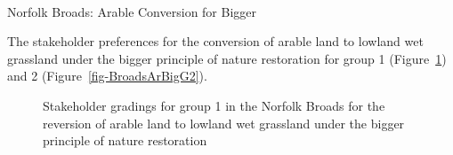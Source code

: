 \documentclass[
  12pt,
  letterpaper,
  DIV=11,
  numbers=noendperiod]{scrartcl}
\makeatletter
\let\oldparagraph\paragraph
\renewcommand{\paragraph}{
    \@ifstar
      \xxxParagraphStar
      \xxxParagraphNoStar
  }
\newcommand{\xxxParagraphStar}[1]{\oldparagraph*{#1}\mbox{}}
\newcommand{\xxxParagraphNoStar}[1]{\oldparagraph{#1}\mbox{}}
\makeatother
\begin{document}
\newpage{}

\paragraph{Norfolk Broads: Arable Conversion for
Bigger}\label{norfolk-broads-arable-conversion-for-bigger}

The stakeholder preferences for the conversion of arable land to lowland
wet grassland under the bigger principle of nature restoration for group
1 (Figure~\ref{fig-BroadsArBigG1}) and 2
(Figure~\ref{fig-BroadsArBigG2}).

\begin{figure}[H]


\caption{\label{fig-BroadsArBigG1}Stakeholder gradings for group 1 in
the Norfolk Broads for the reversion of arable land to lowland wet
grassland under the bigger principle of nature restoration}

\end{figure}%
\end{document}
